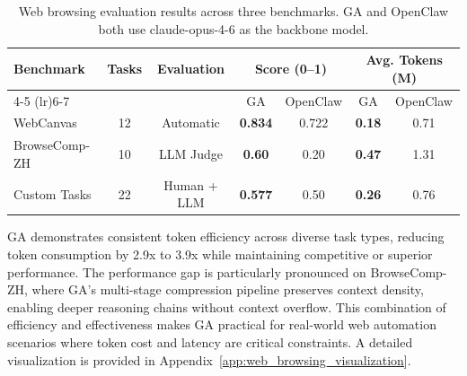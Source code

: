 \begin{table}[t]
\centering
\small
\caption{Web browsing evaluation results across three benchmarks. GA and OpenClaw both use claude-opus-4-6 as the backbone model.}
\begin{tabular}{lcccccc}
\toprule
\multirow{2}{*}{Benchmark} & \multirow{2}{*}{Tasks} & \multirow{2}{*}{Evaluation} & \multicolumn{2}{c}{Score (0--1)} & \multicolumn{2}{c}{Avg. Tokens (M)} \\
\cmidrule(lr){4-5} \cmidrule(lr){6-7}
 &  &  & GA & OpenClaw & GA & OpenClaw \\
\midrule
WebCanvas & 12 & Automatic & \textbf{0.834} & 0.722 & \textbf{0.18} & 0.71 \\
BrowseComp-ZH & 10 & LLM Judge & \textbf{0.60} & 0.20 & \textbf{0.47} & 1.31 \\
Custom Tasks & 22 & Human + LLM & \textbf{0.577} & 0.50 & \textbf{0.26} & 0.76 \\
\bottomrule
\end{tabular}
\label{tab:web_browsing_results}
\end{table}

GA demonstrates consistent token efficiency across diverse task types, reducing token consumption by 2.9x to 3.9x while maintaining competitive or superior performance. The performance gap is particularly pronounced on BrowseComp-ZH, where GA's multi-stage compression pipeline preserves context density, enabling deeper reasoning chains without context overflow. This combination of efficiency and effectiveness makes GA practical for real-world web automation scenarios where token cost and latency are critical constraints. A detailed visualization is provided in Appendix~\ref{app:web_browsing_visualization}.
